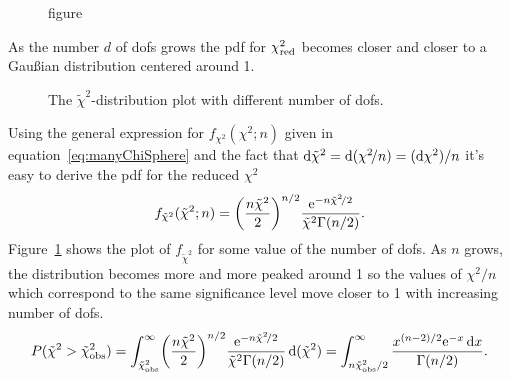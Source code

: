 \begin{figure}
	\color{red}figure
\end{figure}


As the number $d$ of \acp{dof} grows the \ac{pdf} for $\chi^2_\textup{red}$ becomes closer and closer to a Gau\ss{}ian distribution centered around \num{1}.
\begin{figure}
	\centering
	\caption{The $\tilde\chi^2$-distribution plot with different number of \acp{dof}.}
	\label{fig:RedChiSquareDistro}
\end{figure}
Using the general expression for $f_{\chi^2}(\chi^2;n)$ given in equation~\eqref{eq:manyChiSphere} and the fact that $\mathop{}\!\mathrm{d}\tilde\chi^2=\mathop{}\!\mathrm{d}(\chi^2\!/n) = (\mathop{}\!\mathrm{d}\chi^2)/n$ it's easy to derive the \ac{pdf} for the reduced $\chi^2$
\begin{equation}
	f_{\tilde\chi^2}(\tilde\chi^2;n) = \biggl(\frac{n\tilde\chi^2}{2}\biggr)^{n/2} \frac{\mathrm{e}^{-n\tilde\chi^2\!/2}}{\tilde\chi^2\Gamma(n/2)}.
\end{equation}
Figure~\ref{fig:RedChiSquareDistro} shows the plot of $f_{\tilde\chi^2}$ for some value of the number of \acp{dof}.
As $n$ grows, the distribution becomes more and more peaked around \num{1} so the values of $\chi^2\!/n$ which correspond to the same significance level move closer to \num{1} with increasing number of \acp{dof}.
\begin{equation}\label{eq:ProbChiSquareGeneral}
	P(\tilde\chi^2>\tilde\chi^2_\textup{obs}) 
	=\int_{\tilde\chi^2_\textup{obs}}^\infty \biggl(\frac{n\tilde\chi^2}{2}\biggr)^{n/2} \frac{\eu^{-n\tilde\chi^2\!/2}}{\tilde\chi^2\Gamma(n/2)}\ud(\tilde\chi^2)%
	= \int_{n\tilde\chi^2_\textup{obs}/2}^\infty \frac{x^{(n-2)/2}\eu^{-x}\ud x}{\Gamma(n/2)}.
\end{equation}
